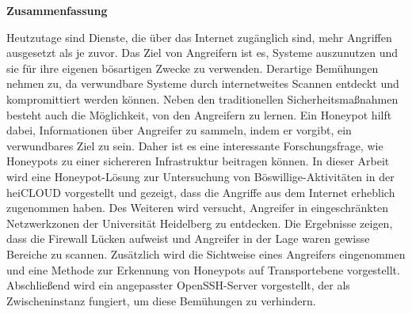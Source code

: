 \thispagestyle{empty}
\begin{center}
    \begin{minipage}[c][0.48\textheight][b]{0.9\textwidth}
        \small
        \begin{center}
            \textbf{Zusammenfassung}
        \end{center}\par
        \vspace{\baselineskip}
        Heutzutage sind Dienste, die über das Internet zugänglich sind, mehr Angriffen ausgesetzt als je zuvor.
        Das Ziel von Angreifern ist es, Systeme auszunutzen und sie für ihre eigenen bösartigen Zwecke zu verwenden.
        Derartige Bemühungen nehmen zu, da verwundbare Systeme durch internetweites Scannen entdeckt und kompromittiert werden können.
        Neben den traditionellen Sicherheitsmaßnahmen besteht auch die Möglichkeit, von den Angreifern zu lernen.
        Ein Honeypot hilft dabei, Informationen über Angreifer zu sammeln, indem er vorgibt, ein verwundbares Ziel zu sein.
        Daher ist es eine interessante Forschungsfrage, wie Honeypots zu einer sichereren Infrastruktur beitragen können.
        In dieser Arbeit wird eine Honeypot-Lösung zur Untersuchung von Böswillige-Aktivitäten in der heiCLOUD vorgestellt und gezeigt, dass die Angriffe aus dem Internet erheblich zugenommen haben.
        Des Weiteren wird versucht, Angreifer in eingeschränkten Netzwerkzonen der Universität Heidelberg zu entdecken.
        Die Ergebnisse zeigen, dass die Firewall Lücken aufweist und Angreifer in der Lage waren gewisse Bereiche zu scannen.
        Zusätzlich wird die Sichtweise eines Angreifers eingenommen und eine Methode zur Erkennung von Honeypots auf Transportebene vorgestellt.
        Abschließend wird ein angepasster OpenSSH-Server vorgestellt, der als Zwischeninstanz fungiert, um diese Bemühungen zu verhindern.
    \end{minipage}\par
    \vfill
\end{center}